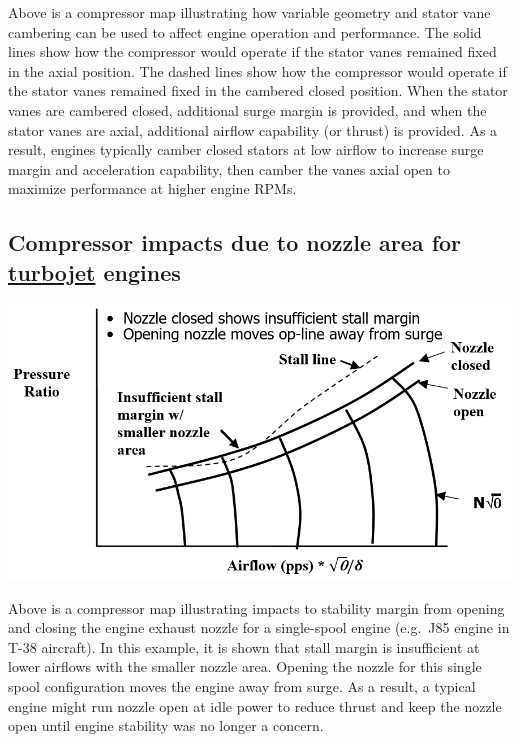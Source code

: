 \documentclass[
]{book}
\begin{document}
Above is a compressor map illustrating how variable geometry and stator vane
cambering can be used to affect engine operation and performance. The solid
lines show how the compressor would operate if the stator vanes remained fixed
in the axial position. The dashed lines show how the compressor would operate
if the stator vanes remained fixed in the cambered closed position. When the
stator vanes are cambered closed, additional surge margin is provided, and when
the stator vanes are axial, additional airflow capability (or thrust) is
provided. As a result, engines typically camber closed stators at low airflow
to increase surge margin and acceleration capability, then camber the vanes
axial open to maximize performance at higher engine RPMs.

\hypertarget{compressor-impacts-due-to-nozzle-area-for-turbojet-engines}{%
\subsection{\texorpdfstring{Compressor impacts due to nozzle area for \underline{turbojet} engines}{Compressor impacts due to nozzle area for turbojet engines}}\label{compressor-impacts-due-to-nozzle-area-for-turbojet-engines}}

\includegraphics{media/17/turbojet-open-close-nozzle-compressor-map.png}

Above is a compressor map illustrating impacts to stability margin from opening
and closing the engine exhaust nozzle for a single-spool engine (e.g.~J85 engine
in T-38 aircraft). In this example, it is shown that stall margin is
insufficient at lower airflows with the smaller nozzle area. Opening the nozzle
for this single spool configuration moves the engine away from surge. As a
result, a typical engine might run nozzle open at idle power to reduce thrust
and keep the nozzle open until engine stability was no longer a concern.
\end{document}
